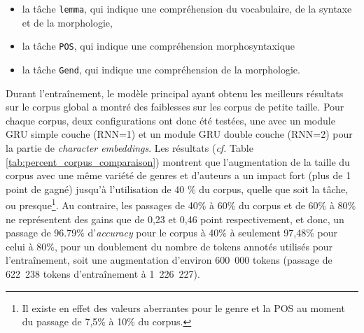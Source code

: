\begin{itemize}
    \item la tâche \texttt{lemma}, qui indique une compréhension du vocabulaire, de la syntaxe et de la morphologie,
    \item la tâche \texttt{POS}, qui indique une compréhension morphosyntaxique
    \item la tâche \texttt{Gend}, qui indique une compréhension de la morphologie.
\end{itemize}

Durant l'entraînement, le modèle principal ayant obtenu les meilleurs résultats sur le corpus global a montré des faiblesses sur les corpus de petite taille. Pour chaque corpus, deux configurations ont donc été testées, une avec un module GRU simple couche (RNN=1) et un module GRU double couche (RNN=2) pour la partie de \textit{character embeddings}. Les résultats (\textit{cf.} Table \ref{tab:percent_corpus_comparaison}) montrent que l'augmentation de la taille du corpus avec une même variété de genres et d'auteurs a un impact fort (plus de 1 point de gagné) jusqu'à l'utilisation de 40 \% du corpus, quelle que soit la tâche, ou presque\footnote{Il existe en effet des valeurs aberrantes pour le genre et la POS au moment du passage de 7,5\% à 10\% du corpus.}. Au contraire, les passages de 40\% à 60\% du corpus et de 60\% à 80\% ne représentent des gains que de 0,23 et 0,46 point respectivement, et donc, un passage de 96.79\% d'\textit{accuracy} pour le corpus à 40\% à seulement 97,48\% pour celui à 80\%, pour un doublement du nombre de tokens annotés utilisés pour l'entraînement, soit une augmentation d'environ 600~000 tokens (passage de 622~238 tokens d'entraînement à 1~226~227).


